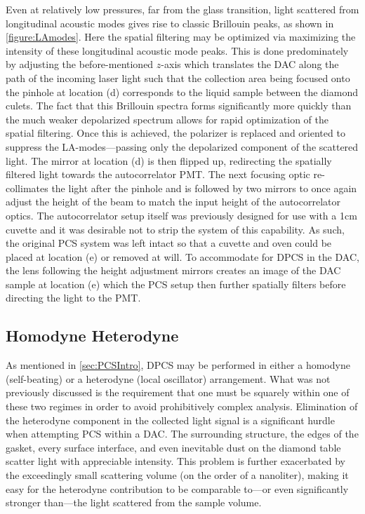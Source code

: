 Even at relatively low pressures, far from the glass transition, light scattered from longitudinal acoustic modes gives rise to classic Brillouin peaks, as shown in \fig \ref{figure:LAmodes}. Here the spatial filtering may be optimized via maximizing the intensity of these longitudinal acoustic mode peaks. This is done predominately by adjusting the before-mentioned $z$-axis which translates the DAC along the path of the incoming laser light such that the collection area being focused onto the pinhole at location (d) corresponds to the liquid sample between the diamond culets. The fact that this Brillouin spectra forms significantly more quickly than the much weaker depolarized spectrum allows for rapid optimization of the spatial filtering. Once this is achieved, the polarizer is replaced and oriented to suppress the LA-modes—passing only the depolarized component of the scattered light. The mirror at location (d) is then flipped up, redirecting the spatially filtered light towards the autocorrelator PMT. The next focusing optic re-collimates the light after the pinhole and is followed by two mirrors to once again adjust the height of the beam to match the input height of the autocorrelator optics. The autocorrelator setup itself was previously designed for use with a 1cm cuvette and it was desirable not to strip the system of this capability. As such, the original PCS system was left intact so that a cuvette and oven could be placed at location (e) or removed at will. To accommodate for DPCS in the DAC, the lens following the height adjustment mirrors creates an image of the DAC sample at location (e) which the PCS setup then further spatially filters before directing the light to the PMT.  

\subsection{Homodyne \vs Heterodyne} \label{sec:HomoHeto}

As mentioned in \sect \ref{sec:PCSIntro}, DPCS may be performed in either a homodyne (self-beating) or a heterodyne (local oscillator) arrangement. What was not previously discussed is the requirement that one must be squarely within one of these two regimes in order to avoid prohibitively complex analysis. Elimination of the heterodyne component in the collected light signal is a significant hurdle when attempting PCS within a DAC. The surrounding structure, the edges of the gasket, every surface interface, and even inevitable dust on the diamond table scatter light with appreciable intensity. This problem is further exacerbated by the exceedingly small scattering volume (on the order of a nanoliter), making it easy for the heterodyne contribution to be comparable to—or even significantly stronger than—the light scattered from the sample volume.  

